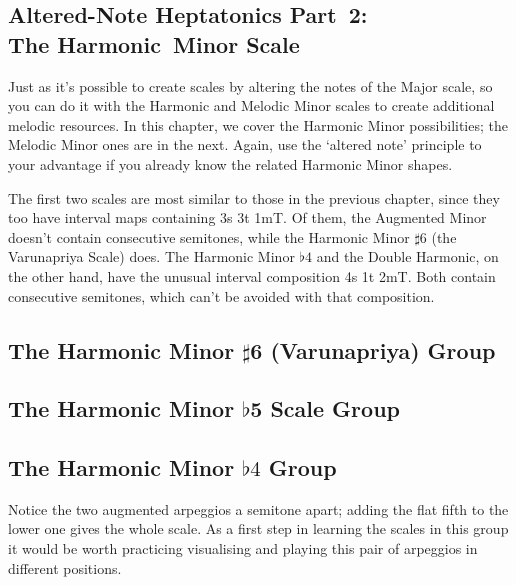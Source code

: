 \documentclass[english]{./gbook}
\newcommand{\titlebreak}{}
\begin{document}
\begin{large}
\chapter{\mbox{Altered-Note} \titlebreak \mbox{Heptatonics} \mbox{Part 2:}\\ The Harmonic\ Minor Scale}
Just as it's possible to create scales by altering the notes of the Major scale, so you can do it with the Harmonic and Melodic Minor scales to create additional melodic resources. In this chapter, we cover the Harmonic Minor possibilities; the Melodic Minor ones are in the next. Again, use the `altered note' principle to your advantage if you already know the related Harmonic Minor shapes.

The first two scales are most similar to those in the previous chapter, since they too have interval maps containing 3s 3t 1mT. Of them, the Augmented Minor doesn't contain consecutive semitones, while the Harmonic Minor $\sharp 6$ (the Varunapriya Scale) does. The Harmonic Minor $\flat 4$  and the Double Harmonic, on the other hand, have the unusual interval composition 4s 1t 2mT. Both contain consecutive semitones, which can't be avoided with that composition.

\section{The Harmonic Minor $\sharp$6 (Varunapriya) Group}

\section{The Harmonic Minor $\flat$5 Scale Group}

\section{The Harmonic Minor $\flat 4$ Group}
Notice the two augmented arpeggios a semitone apart; adding the flat fifth to the lower one gives the whole scale. As a first step in learning the scales in this group it would be worth practicing visualising and playing this pair of arpeggios in different positions.


\end{large}
\end{document}
